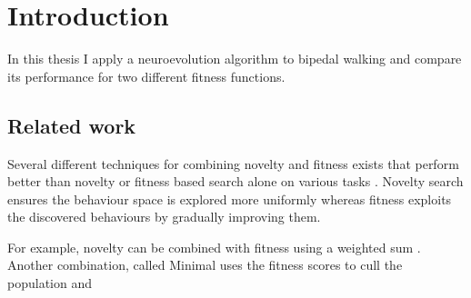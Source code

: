 \section{Introduction}



\label{sec:intro}


In this thesis I apply a neuroevolution algorithm to bipedal walking and compare its performance for two different fitness functions.
\todo{}


\subsection{Related work}
Several different techniques for combining novelty and fitness exists that perform better than novelty or
fitness based search alone on various tasks \cite{ns_study}. Novelty search ensures the behaviour space is explored
more uniformly whereas fitness exploits the discovered behaviours by gradually improving them.

For example, novelty can be combined with fitness using a weighted sum \cite{}.
Another combination, called Minimal  uses the fitness scores to cull the population
and
